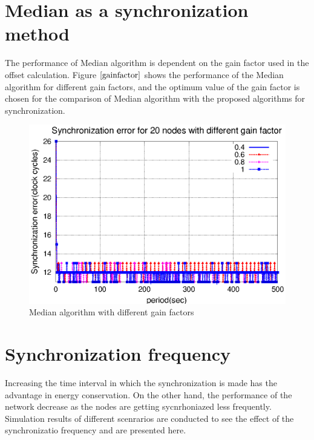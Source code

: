 \documentclass[a4paper,10pt]{report}
\begin{document}
\section{\textbf{Median as a synchronization method}}
The performance of Median algorithm is dependent on the gain factor used in the offset calculation. Figure $\ref{gainfactor}$ shows the performance of the Median algorithm for different gain factors, and the optimum value of the gain factor is chosen for the comparison of Median algorithm with the proposed algorithms for synchronization.
\begin{figure}[!h]
\centering
\includegraphics[width= 0.7 \textwidth]{gainfactor}
\caption{Median algorithm with different gain factors} \label{gainfactor}
\end{figure}
\section{\textbf{Synchronization frequency}}
Increasing the time interval in which the synchronization is made has the advantage in energy conservation. On the other hand, the performance of the network decrease as the nodes are getting sycnrhoniazed less frequently. Simulation results of different scenrarios are conducted to see the effect of the synchronizatio frequency and are presented here.
\end{document}
